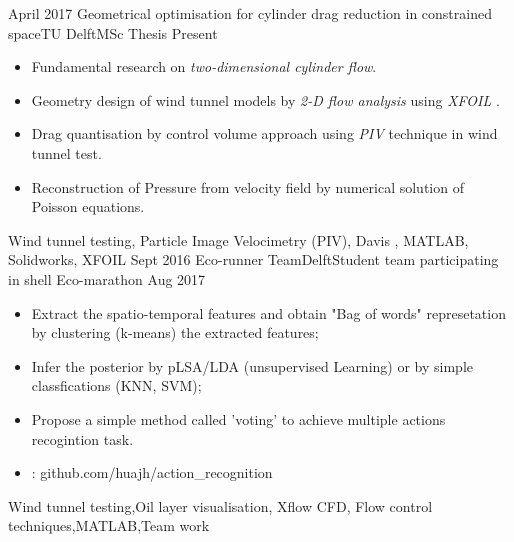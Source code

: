%
%


 
\begin{experiences}
	
		
 \experience
    {April 2017}   {Geometrical optimisation for cylinder drag reduction in constrained space}{TU Delft}{MSc Thesis}
    {Present} {
                      \begin{itemize}
                        \item Fundamental research on \emph{two-dimensional cylinder flow}.  
                         \item Geometry design of wind tunnel models by \emph{2-D flow analysis} using \emph{XFOIL} .
                        \item Drag quantisation by control volume approach using \emph{PIV} technique in wind tunnel test.                  
                        \item Reconstruction of Pressure from velocity field by numerical solution of Poisson equations.
                       
                      \end{itemize}
                    }
                    {Wind tunnel testing, Particle Image Velocimetry (PIV), Davis , MATLAB, Solidworks, XFOIL }
  \emptySeparator
  \experience
    {Sept 2016} {Eco-runner Team}{Delft}{Student team participating in shell Eco-marathon }
    {Aug 2017}    {
                      \begin{itemize}
                        \item Extract the spatio-temporal features and obtain "Bag of words" represetation by clustering (k-means) the extracted features; 
                        \item Infer the posterior by pLSA/LDA (unsupervised Learning) or by simple classfications (KNN, SVM);                    
                        \item Propose a simple method called 'voting' to achieve multiple actions recogintion task.
                        \item \faGithub:  {github.com/huajh/action\_recognition}                                                                                          
                      \end{itemize}
                    }
                    {Wind tunnel testing,Oil layer visualisation, Xflow CFD, Flow control techniques,MATLAB,Team work}


\end{experiences}
